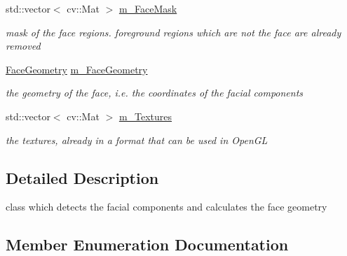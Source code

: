 \begin{DoxyCompactItemize}
std\+::vector$<$ cv\+::\+Mat $>$ \hyperlink{class_face3_d_1_1_detection_a4dff33b175f5b2aff949db62e4c95b88}{m\+\_\+\+Face\+Mask}
\begin{DoxyCompactList}\small\item\em mask of the face regions. foreground regions which are not the face are already removed \end{DoxyCompactList}\item 
\hyperlink{class_face3_d_1_1_face_geometry}{Face\+Geometry} \hyperlink{class_face3_d_1_1_detection_a4eed1e18b8465d43d75102bf10ce8575}{m\+\_\+\+Face\+Geometry}
\begin{DoxyCompactList}\small\item\em the geometry of the face, i.\+e. the coordinates of the facial components \end{DoxyCompactList}\item 
std\+::vector$<$ cv\+::\+Mat $>$ \hyperlink{class_face3_d_1_1_detection_a5dbd240320bc7a4c1661b63e23bee777}{m\+\_\+\+Textures}
\begin{DoxyCompactList}\small\item\em the textures, already in a format that can be used in Open\+GL \end{DoxyCompactList}\end{DoxyCompactItemize}


\subsection{Detailed Description}
class which detects the facial components and calculates the face geometry 

\subsection{Member Enumeration Documentation}
